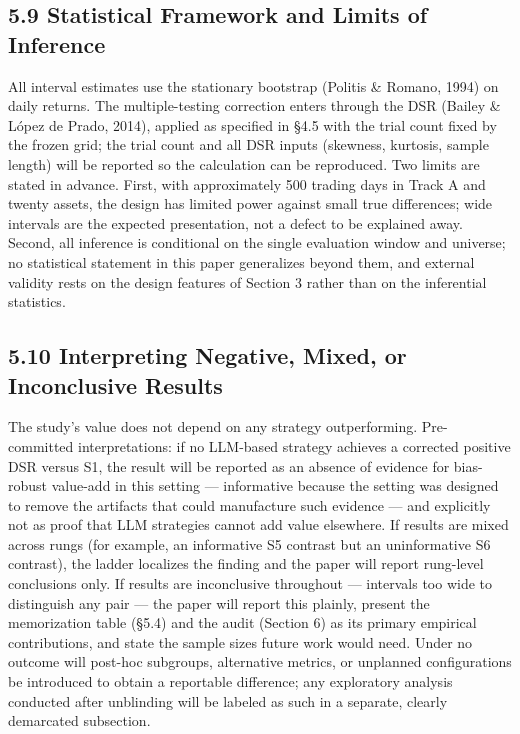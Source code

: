 \documentclass[
  12pt,
]{article}
\begin{document}
\hypertarget{statistical-framework-and-limits-of-inference}{%
\subsection{5.9 Statistical Framework and Limits of
Inference}\label{statistical-framework-and-limits-of-inference}}

All interval estimates use the stationary bootstrap (Politis \& Romano,
1994) on daily returns. The multiple-testing correction enters through
the DSR (Bailey \& López de Prado, 2014), applied as specified in §4.5
with the trial count fixed by the frozen grid; the trial count and all
DSR inputs (skewness, kurtosis, sample length) will be reported so the
calculation can be reproduced. Two limits are stated in advance. First,
with approximately 500 trading days in Track A and twenty assets, the
design has limited power against small true differences; wide intervals
are the expected presentation, not a defect to be explained away.
Second, all inference is conditional on the single evaluation window and
universe; no statistical statement in this paper generalizes beyond
them, and external validity rests on the design features of Section 3
rather than on the inferential statistics.

\hypertarget{interpreting-negative-mixed-or-inconclusive-results}{%
\subsection{5.10 Interpreting Negative, Mixed, or Inconclusive
Results}\label{interpreting-negative-mixed-or-inconclusive-results}}

The study's value does not depend on any strategy outperforming.
Pre-committed interpretations: if no LLM-based strategy achieves a
corrected positive DSR versus S1, the result will be reported as an
absence of evidence for bias-robust value-add in this setting ---
informative because the setting was designed to remove the artifacts
that could manufacture such evidence --- and explicitly not as proof
that LLM strategies cannot add value elsewhere. If results are mixed
across rungs (for example, an informative S5 contrast but an
uninformative S6 contrast), the ladder localizes the finding and the
paper will report rung-level conclusions only. If results are
inconclusive throughout --- intervals too wide to distinguish any pair
--- the paper will report this plainly, present the memorization table
(§5.4) and the audit (Section 6) as its primary empirical contributions,
and state the sample sizes future work would need. Under no outcome will
post-hoc subgroups, alternative metrics, or unplanned configurations be
introduced to obtain a reportable difference; any exploratory analysis
conducted after unblinding will be labeled as such in a separate,
clearly demarcated subsection.
\end{document}
